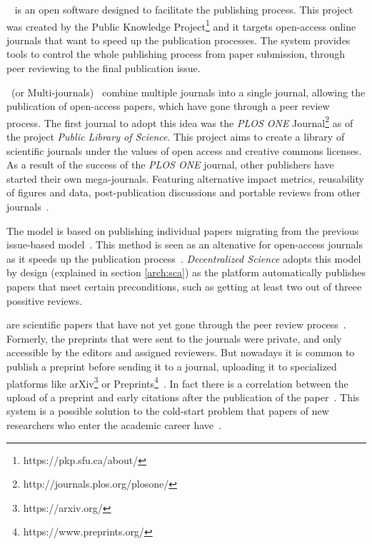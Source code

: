 ~\cite{willinsky2005open} is an open software designed
to facilitate the publishing process. This project was created by the Public
Knowledge Project\footnote{https://pkp.sfu.ca/about/} and it targets open-access
online journals that want to speed up the publication processes. The system
provides tools to control the whole publishing process from paper submission,
through peer reviewing to the final publication issue.

~(or Multi-journals)~\cite{binfield2013open,wellen2013open}
combine multiple journals into a single journal, allowing the publication of
open-access papers, which have gone through a peer review process. The first
journal to adopt this idea was the \emph{PLOS ONE}
Journal\footnote{http://journals.plos.org/plosone/} as of the project
\emph{Public Library of Science}. This project aims to create a library of
scientific journals under the values of open access and creative commons
licenses. As a result of the success of the \emph{PLOS ONE} journal, other
publishers have started their own mega-journals. Featuring alternative impact
metrics, reusability of figures and data, post-publication discussions and
portable reviews from other journals~\cite{bjork2015have}.

The  model is based on publishing individual papers
migrating from the previous issue-based model~\cite{anderton2013continuous}.
This method is seen as an altenative for open-access journals as it speeds up
the publication process~\cite{haymanview}. \emph{Decentralized Science} adopts
this model by design (explained in section \ref{arch:sca}) as the platform
automatically  publishes papers that meet
certain preconditions, such as getting at least two out of threee possitive reviews.

 are scientific papers that have not yet gone through the peer
review process~\cite{harnad2003electronic}. Formerly, the preprints that were
sent to the journals were private, and only accessible by the editors and
assigned reviewers. But nowadays it is common to publish a preprint before
sending it to a journal, uploading it to specialized platforms like
arXiv\footnote{https://arxiv.org/} or
Preprints\footnote{https://www.preprints.org/}~\cite{brown2001volution}. In fact
there is a correlation between the upload of a preprint and early citations
after the publication of the paper~\cite{shuai2012scientific}. This system is a
possible solution to the cold-start problem that papers of new researchers who
enter the academic career have~\cite{sugiyama2010scholarly}.

